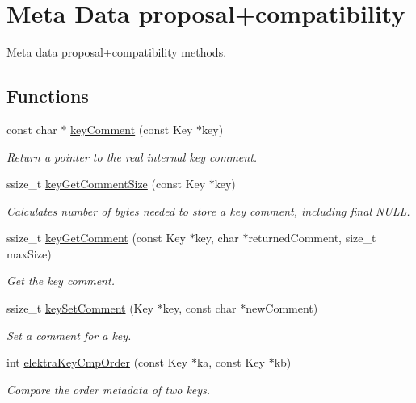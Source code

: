 \hypertarget{group__meta}{}\section{Meta Data proposal+compatibility}
\label{group__meta}


Meta data proposal+compatibility methods.  


\subsection*{Functions}
\begin{DoxyCompactItemize}
\item 
const char $\ast$ \hyperlink{group__meta_gac89fd319783b3457db45b4c09e55274a}{key\+Comment} (const Key $\ast$key)
\begin{DoxyCompactList}\small\item\em Return a pointer to the real internal {\ttfamily key} comment. \end{DoxyCompactList}\item 
ssize\+\_\+t \hyperlink{group__meta_ga0dd737fadc16d4cf16720d17f066a9d3}{key\+Get\+Comment\+Size} (const Key $\ast$key)
\begin{DoxyCompactList}\small\item\em Calculates number of bytes needed to store a key comment, including final N\+U\+LL. \end{DoxyCompactList}\item 
ssize\+\_\+t \hyperlink{group__meta_gafb89735689929ff717cc9f2d0d0b46a2}{key\+Get\+Comment} (const Key $\ast$key, char $\ast$returned\+Comment, size\+\_\+t max\+Size)
\begin{DoxyCompactList}\small\item\em Get the key comment. \end{DoxyCompactList}\item 
ssize\+\_\+t \hyperlink{group__meta_ga8863a877a84fa46e6017fe72e49b89c1}{key\+Set\+Comment} (Key $\ast$key, const char $\ast$new\+Comment)
\begin{DoxyCompactList}\small\item\em Set a comment for a key. \end{DoxyCompactList}\item 
int \hyperlink{group__meta_gab8b30dfabb0867bd6899e60e7bd193a2}{elektra\+Key\+Cmp\+Order} (const Key $\ast$ka, const Key $\ast$kb)
\begin{DoxyCompactList}\small\item\em Compare the order metadata of two keys. \end{DoxyCompactList}\item 

\end{DoxyCompactItemize}
